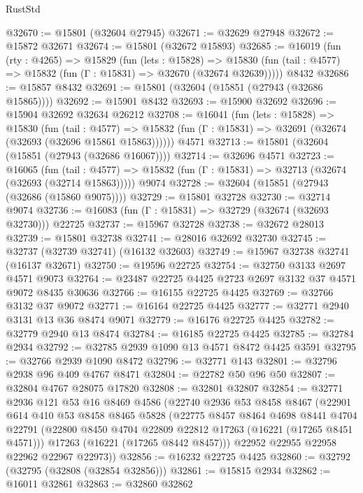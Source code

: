\begin{lexlean}{RustStd}
\begin{coremodule}
@32670 := @15801 (@32604 @27945)
@32671 := @32629 @27948
@32672 := @15872 @32671
@32674 := @15801 (@32672 @15893)
@32685 := @16019
    (fun (rty : @4265) =>
    @15829
      (fun (lets : @15828) =>
      @15830 (fun (tail : @4577) => @15832 (fun (Γ : @15831) => @32670 (@32674 @32639)))))
    @8432
@32686 := @15857 @8432
@32691 := @15801 (@32604 (@15851 (@27943 (@32686 @15865))))
@32692 := @15901 @8432
@32693 := @15900 @32692
@32696 := @15904 @32692 @32634 @26212
@32708 := @16041
    (fun (lets : @15828) =>
    @15830
      (fun (tail : @4577) =>
      @15832 (fun (Γ : @15831) => @32691 (@32674 (@32693 (@32696 @15861 @15863))))))
    @4571
@32713 := @15801 (@32604 (@15851 (@27943 (@32686 @16067))))
@32714 := @32696 @4571
@32723 := @16065
    (fun (tail : @4577) => @15832 (fun (Γ : @15831) => @32713 (@32674 (@32693 (@32714 @15863)))))
    @9074
@32728 := @32604 (@15851 (@27943 (@32686 (@15860 @9075))))
@32729 := @15801 @32728
@32730 := @32714 @9074
@32736 := @16083 (fun (Γ : @15831) => @32729 (@32674 (@32693 @32730))) @22725
@32737 := @15967 @32728
@32738 := @32672 @28013
@32739 := @15801 @32738
@32741 := @28016 @32692 @32730
@32745 := @32737 (@32739 @32741) (@16132 @32603)
@32749 := @15967 @32738 @32741 (@16137 @32671)
@32750 := @19596 @22725
@32754 := @32750 @3133 @2697 @4571 @9073
@32764 := @23487 @22725 @4425 @2723 @2697 @3132 @37 @4571 @9072 @8435 @30636
@32766 := @16155 @22725 @4425
@32769 := @32766 @3132 @37 @9072
@32771 := @16164 @22725 @4425
@32777 := @32771 @2940 @3131 @13 @36 @8474 @9071
@32779 := @16176 @22725 @4425
@32782 := @32779 @2940 @13 @8474
@32784 := @16185 @22725 @4425
@32785 := @32784 @2934
@32792 := @32785 @2939 @1090 @13 @4571 @8472 @4425 @3591
@32795 := @32766 @2939 @1090 @8472
@32796 := @32771 @143
@32801 := @32796 @2938 @96 @409 @4767 @8471
@32804 := @22782 @50 @96 @50
@32807 := @32804 @4767 @28075 @17820
@32808 := @32801 @32807
@32854 := @32771
    @2936
    @121
    @53
    @16
    @8469
    @4586
    (@22740
      @2936
      @53
      @8458
      @8467
      (@22901
        @614
        @410
        @53
        @8458
        @8465
        @5828
        (@22775
          @8457
          @8464
          @4698
          @8441
          @4704
          @22791
          (@22800 @8450 @4704 @22809 @22812 @17263 (@16221 (@17265 @8451 @4571)))
          @17263
          (@16221 (@17265 @8442 @8457)))
        @22952
        @22955
        @22958
        @22962
        @22967
        @22973))
@32856 := @16232 @22725 @4425
@32860 := @32792 (@32795 (@32808 (@32854 @32856)))
@32861 := @15815 @2934
@32862 := @16011 @32861
@32863 := @32860 @32862

\end{coremodule}
\end{lexlean}
